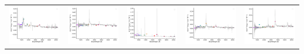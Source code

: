 \begin{center}
\begin{longtable}{l l l l l }
    \includegraphics[width=0.19\linewidth, clip]{Figs/Figs-sdss/spec-4202-55445-0409-SPLUS-s02s09-042917.pdf} & \includegraphics[width=0.19\linewidth, clip]{Figs/Figs-sdss/spec-4204-55470-0588-STRIPE82-0142-034401.pdf} & \includegraphics[width=0.19\linewidth, clip]{Figs/Figs-sdss/spec-4205-55454-0490-STRIPE82-0143-027848.pdf} & \includegraphics[width=0.19\linewidth, clip]{Figs/Figs-sdss/spec-4206-55471-0352-STRIPE82-0147-043690.pdf} & \includegraphics[width=0.19\linewidth, clip]{Figs/Figs-sdss/spec-4217-55478-0338-STRIPE82-0003-028018.pdf} \\

\end{longtable}
\end{center}
